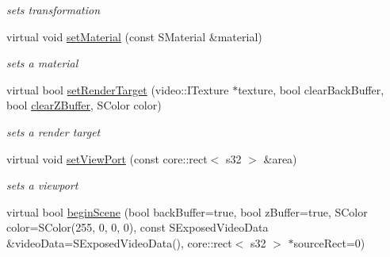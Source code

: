 \begin{DoxyCompactItemize}
\begin{DoxyCompactList}\small\item\em sets transformation \end{DoxyCompactList}\item 
\hypertarget{classirr_1_1video_1_1_c_burning_video_driver_ae3710be6da3fcefadadfb333e7e4a95a}{virtual void \hyperlink{classirr_1_1video_1_1_c_burning_video_driver_ae3710be6da3fcefadadfb333e7e4a95a}{set\-Material} (const S\-Material \&material)}\label{classirr_1_1video_1_1_c_burning_video_driver_ae3710be6da3fcefadadfb333e7e4a95a}

\begin{DoxyCompactList}\small\item\em sets a material \end{DoxyCompactList}\item 
\hypertarget{classirr_1_1video_1_1_c_burning_video_driver_a53ee544c7c6d3be3299fbf464cf0c0f4}{virtual bool \hyperlink{classirr_1_1video_1_1_c_burning_video_driver_a53ee544c7c6d3be3299fbf464cf0c0f4}{set\-Render\-Target} (video\-::\-I\-Texture $\ast$texture, bool clear\-Back\-Buffer, bool \hyperlink{classirr_1_1video_1_1_c_burning_video_driver_a95c9a9a76d8a3fd695961ea9ec279734}{clear\-Z\-Buffer}, S\-Color color)}\label{classirr_1_1video_1_1_c_burning_video_driver_a53ee544c7c6d3be3299fbf464cf0c0f4}

\begin{DoxyCompactList}\small\item\em sets a render target \end{DoxyCompactList}\item 
\hypertarget{classirr_1_1video_1_1_c_burning_video_driver_a5f8c7f18d37dc32db21838d39090b2c5}{virtual void \hyperlink{classirr_1_1video_1_1_c_burning_video_driver_a5f8c7f18d37dc32db21838d39090b2c5}{set\-View\-Port} (const core\-::rect$<$ s32 $>$ \&area)}\label{classirr_1_1video_1_1_c_burning_video_driver_a5f8c7f18d37dc32db21838d39090b2c5}

\begin{DoxyCompactList}\small\item\em sets a viewport \end{DoxyCompactList}\item 
\hypertarget{classirr_1_1video_1_1_c_burning_video_driver_ad545cfcdcbaf7da5b0aa63e68dd30723}{virtual bool \hyperlink{classirr_1_1video_1_1_c_burning_video_driver_ad545cfcdcbaf7da5b0aa63e68dd30723}{begin\-Scene} (bool back\-Buffer=true, bool z\-Buffer=true, S\-Color color=S\-Color(255, 0, 0, 0), const S\-Exposed\-Video\-Data \&video\-Data=S\-Exposed\-Video\-Data(), core\-::rect$<$ s32 $>$ $\ast$source\-Rect=0)}\label{classirr_1_1video_1_1_c_burning_video_driver_ad545cfcdcbaf7da5b0aa63e68dd30723}


\end{DoxyCompactItemize}
